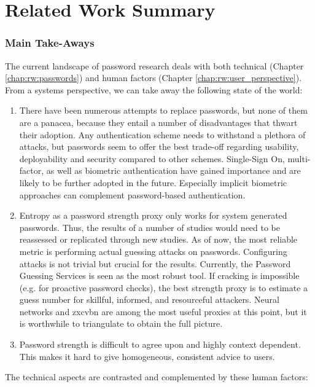 
\chapter[Related Work Summary]{Related Work Summary}\label{chap:rw:summary}

\subsection*{Main Take-Aways}
The current landscape of password research deals with both technical (Chapter \ref{chap:rw:passwords}) and human factors (Chapter \ref{chap:rw:user_perspective}). From a systems perspective, we can take away the following state of the world:
\begin{enumerate}
	\item There have been numerous attempts to replace passwords, but none of them are a panacea, because they entail a number of disadvantages that thwart their adoption. Any authentication scheme needs to withstand a plethora of attacks, but passwords seem to offer the best trade-off regarding usability, deployability and security compared to other schemes. Single-Sign On, multi-factor, as well as biometric authentication have gained importance and are likely to be further adopted in the future. Especially implicit biometric approaches can complement password-based authentication.
	\item Entropy as a password strength proxy only works for system generated passwords. Thus, the results of a number of studies would need to be reassessed or replicated through new studies. As of now, the most reliable metric is performing actual guessing attacks on passwords. Configuring attacks is not trivial but crucial for the results. Currently, the Password Guessing Services is seen as the most robust tool. If cracking is impossible (e.g. for proactive password checks), the best strength proxy is to estimate a guess number for skillful, informed, and resourceful attackers. Neural networks and zxcvbn are among the most useful proxies at this point, but it is worthwhile to triangulate to obtain the full picture.  
	\item Password strength is difficult to agree upon and highly context dependent. This makes it hard to give homogeneous, consistent advice to users.
\end{enumerate}
The technical aspects are contrasted and complemented by these human factors:
